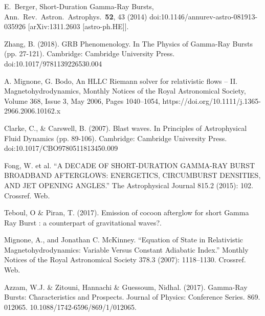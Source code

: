 \documentclass[12pt,a4paper]{book}
\begin{document}
\begin{thebibliography}{20}


  E.~Berger,
  Short-Duration Gamma-Ray Bursts,
  Ann.\ Rev.\ Astron.\ Astrophys.\  {\bf 52}, 43 (2014)
  doi:10.1146/annurev-astro-081913-035926
  [arXiv:1311.2603 [astro-ph.HE]].
 


Zhang, B. (2018). GRB Phenomenology. In The Physics of Gamma-Ray Bursts (pp. 27-121). Cambridge: Cambridge University Press. doi:10.1017/9781139226530.004

A. Mignone, G. Bodo, An HLLC Riemann solver for relativistic flows – II. Magnetohydrodynamics, Monthly Notices of the Royal Astronomical Society, Volume 368, Issue 3, May 2006, Pages 1040–1054, https://doi.org/10.1111/j.1365-2966.2006.10162.x

Clarke, C., \& Carswell, B. (2007). Blast waves. In Principles of Astrophysical Fluid Dynamics (pp. 89-106). Cambridge: Cambridge University Press. doi:10.1017/CBO9780511813450.009

Fong, W. et al. “A DECADE OF SHORT-DURATION GAMMA-RAY BURST BROADBAND AFTERGLOWS: ENERGETICS, CIRCUMBURST DENSITIES, AND JET OPENING ANGLES.” The Astrophysical Journal 815.2 (2015): 102. Crossref. Web.

Teboul, O \& Piran, T. (2017). Emission of cocoon afterglow for short Gamma Ray Burst : a counterpart of gravitational waves?. 

Mignone, A., and Jonathan C. McKinney. “Equation of State in Relativistic Magnetohydrodynamics: Variable Versus Constant Adiabatic Index.” Monthly Notices of the Royal Astronomical Society 378.3 (2007): 1118–1130. Crossref. Web.

Azzam, W.J. \& Zitouni, Hannachi \& Guessoum, Nidhal. (2017). Gamma-Ray Bursts: Characteristics and Prospects. Journal of Physics: Conference Series. 869. 012065. 10.1088/1742-6596/869/1/012065. 


\end{thebibliography}
\end{document}
